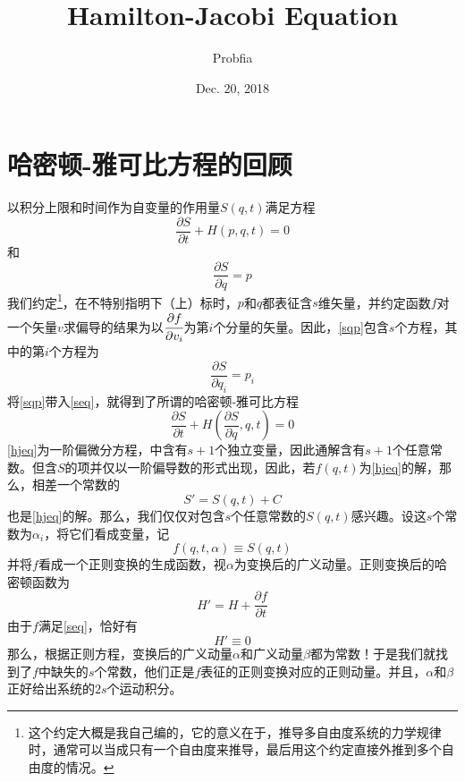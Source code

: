 \documentclass{ctexart}
\title{Hamilton-Jacobi Equation}
\author{Probfia}
\date{Dec. 20, 2018}
\begin{document}
\maketitle
\section{哈密顿-雅可比方程的回顾}
以积分上限和时间作为自变量的作用量$S(q,t)$满足方程
\begin{equation} \label{seq}
\frac{\partial S}{\partial t} + H(p,q,t) = 0
\end{equation}
和
\begin{equation} \label{sqp}
\frac{\partial S}{\partial q} = p
\end{equation}
我们约定\footnote{这个约定大概是我自己编的，它的意义在于，推导多自由度系统的力学规律时，通常可以当成只有一个自由度来推导，最后用这个约定直接外推到多个自由度的情况。}，在不特别指明下（上）标时，$p$和$q$都表征含$s$维矢量，并约定函数$f$对一个矢量$v$求偏导的结果为以$\cfrac{\partial f}{\partial v_i}$为第$i$个分量的矢量。因此，\cref{sqp}包含$s$个方程，其中的第$i$个方程为
\begin{equation}
\frac{\partial S}{\partial q_i} = p_i
\end{equation}
将\cref{sqp}带入\cref{seq}，就得到了所谓的哈密顿-雅可比方程
\begin{equation} \label{hjeq}
\frac{\partial S}{\partial t} + H(\frac{\partial S}{\partial q},q,t) = 0
\end{equation}
\cref{hjeq}为一阶偏微分方程，中含有$s+1$个独立变量，因此通解含有$s+1$个任意常数。但含$S$的项并仅以一阶偏导数的形式出现，因此，若$f(q,t)$为\cref{hjeq}的解，那么，相差一个常数的
\begin{equation}
S' = S(q,t) + C
\end{equation}
也是\cref{hjeq}的解。那么，我们仅仅对包含$s$个任意常数的$S(q,t)$感兴趣。设这$s$个常数为$\alpha_i$，将它们看成变量，记
\begin{equation}
f(q,t,\alpha) \equiv S(q,t)
\end{equation}
并将$f$看成一个正则变换的生成函数，视$\alpha$为变换后的广义动量。正则变换后的哈密顿函数为
\begin{equation}
H' = H + \frac{\partial f}{\partial t}
\end{equation}
由于$f$满足\cref{seq}，恰好有
\begin{equation}
H' \equiv 0
\end{equation}
那么，根据正则方程，变换后的广义动量$\alpha$和广义动量$\beta$都为常数！于是我们就找到了$f$中缺失的$s$个常数，他们正是$f$表征的正则变换对应的正则动量。并且，$\alpha$和$\beta$正好给出系统的$2s$个运动积分。
\end{document}
